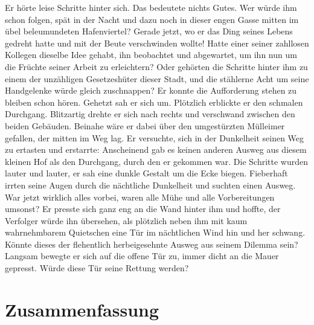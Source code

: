 Er hörte leise Schritte hinter sich. Das bedeutete nichts Gutes. Wer würde ihm schon folgen, spät in der Nacht und dazu noch in dieser engen Gasse mitten im übel beleumundeten Hafenviertel? Gerade jetzt, wo er das Ding seines Lebens gedreht hatte und mit der Beute verschwinden wollte! Hatte einer seiner zahllosen Kollegen dieselbe Idee gehabt, ihn beobachtet und abgewartet, um ihn nun um die Früchte seiner Arbeit zu erleichtern? Oder gehörten die Schritte hinter ihm zu einem der unzähligen Gesetzeshüter dieser Stadt, und die stählerne Acht um seine Handgelenke würde gleich zuschnappen? Er konnte die Aufforderung stehen zu bleiben schon hören. Gehetzt sah er sich um. Plötzlich erblickte er den schmalen Durchgang. Blitzartig drehte er sich nach rechts und verschwand zwischen den beiden Gebäuden. Beinahe wäre er dabei über den umgestürzten Mülleimer gefallen, der mitten im Weg lag. Er versuchte, sich in der Dunkelheit seinen Weg zu ertasten und erstarrte: Anscheinend gab es keinen anderen Ausweg aus diesem kleinen Hof als den Durchgang, durch den er gekommen war. Die Schritte wurden lauter und lauter, er sah eine dunkle Gestalt um die Ecke biegen. Fieberhaft irrten seine Augen durch die nächtliche Dunkelheit und suchten einen Ausweg. War jetzt wirklich alles vorbei, waren alle Mühe und alle Vorbereitungen umsonst? Er presste sich ganz eng an die Wand hinter ihm und hoffte, der Verfolger würde ihn übersehen, als plötzlich neben ihm mit kaum wahrnehmbarem Quietschen eine Tür im nächtlichen Wind hin und her schwang. Könnte dieses der flehentlich herbeigesehnte Ausweg aus seinem Dilemma sein? Langsam bewegte er sich auf die offene Tür zu, immer dicht an die Mauer gepresst. Würde diese Tür seine Rettung werden?

\chapter{Zusammenfassung}\label{c.zusammenfassung}

